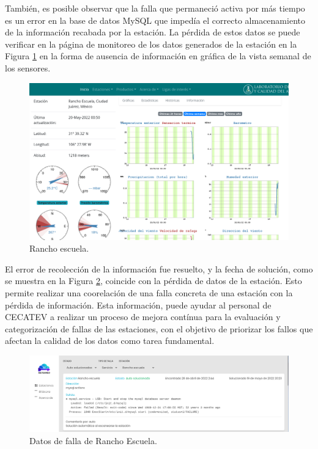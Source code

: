 También, es posible observar que la falla que permaneció activa por más tiempo es un error en la base de datos MySQL que impedía el correcto almacenamiento de la información recabada por la estación. La pérdida de estos datos se puede verificar en la página de monitoreo de los datos generados de la estación en la Figura \ref{fig:rancho-data-loss} en la forma de ausencia de información en gráfica de la vista semanal de los sensores.

\begin{figure}[!ht]
   \centering
   \includegraphics[width=1\linewidth]{images/screenshots/rancho-data-loss.png}
   \caption{Rancho escuela.}
   \label{fig:rancho-data-loss}
\end{figure}

El error de recolección de la información fue resuelto, y la fecha de solución, como se muestra en la Figura \ref{fig:rancho-data-solved}, coincide con la pérdida de datos de la estación. Esto permite realizar una coorelación de una falla concreta de una estación con la pérdida de información. Esta información, puede ayudar al personal de CECATEV a realizar un proceso de mejora contínua para la evaluación y categorización de fallas de las estaciones, con el objetivo de priorizar los fallos que afectan la calidad de los datos como tarea fundamental.

\begin{figure}[!ht]
   \centering
   \includegraphics[width=1\linewidth]{images/screenshots/rancho-mysql-solved.png}
   \caption{Datos de falla de Rancho Escuela.}
   \label{fig:rancho-data-solved}
\end{figure}


